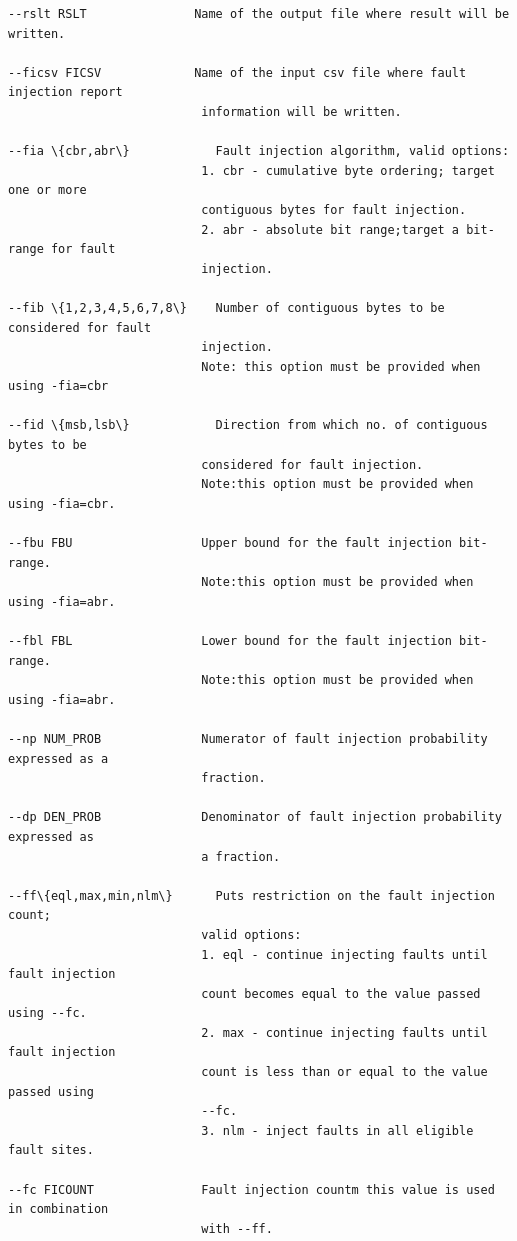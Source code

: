 \documentclass[12pt,a4paper]{article}
\begin{document}
\begin{Verbatim}[fontsize=\relsize{-1},frame=single,framerule=0.1mm,commandchars=\\\{\}]
--rslt RSLT               Name of the output file where result will be written.

--ficsv FICSV             Name of the input csv file where fault injection report
                           information will be written.

--fia \{cbr,abr\}            Fault injection algorithm, valid options: 
                           1. cbr - cumulative byte ordering; target one or more 
                           contiguous bytes for fault injection.
                           2. abr - absolute bit range;target a bit-range for fault 
                           injection.
                        	
--fib \{1,2,3,4,5,6,7,8\}    Number of contiguous bytes to be considered for fault 
                           injection.
                           Note: this option must be provided when using -fia=cbr

--fid \{msb,lsb\}            Direction from which no. of contiguous bytes to be
                           considered for fault injection.
                           Note:this option must be provided when using -fia=cbr.
                           
--fbu FBU                  Upper bound for the fault injection bit-range.
                           Note:this option must be provided when using -fia=abr.

--fbl FBL                  Lower bound for the fault injection bit-range.
                           Note:this option must be provided when using -fia=abr.
                           
--np NUM_PROB              Numerator of fault injection probability expressed as a
                           fraction.

--dp DEN_PROB              Denominator of fault injection probability expressed as
                           a fraction.
                           
--ff\{eql,max,min,nlm\}      Puts restriction on the fault injection count; 
                           valid options:
                           1. eql - continue injecting faults until fault injection 
                           count becomes equal to the value passed using --fc.
                           2. max - continue injecting faults until fault injection 
                           count is less than or equal to the value passed using 
                           --fc.
                           3. nlm - inject faults in all eligible fault sites.

--fc FICOUNT               Fault injection countm this value is used in combination 
                           with --ff.
 \end{Verbatim}  
 
\end{document}

